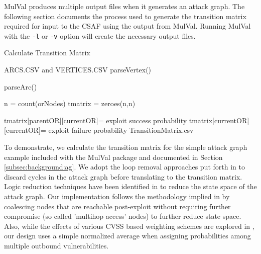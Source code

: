 
MulVal produces multiple output files when it generates an attack graph. The following section documents the process used to generate the transition matrix required for input to the CSAF using the output from MulVal. Running MulVal with the \verb|-l| or \verb|-v| option will create the necessary output files.


\begin{algorithm}
\caption{Calculate Transition Matrix}
\label{genTransMatrix}

\begin{algorithmic}
\REQUIRE ARCS.CSV and VERTICES.CSV
 \STATE parseVertex() 
\ENDFOR

 \STATE parseArc() 
\ENDFOR

\STATE n = count(orNodes) 
\STATE tmatrix = zeroes(n,n) 

 \STATE tmatrix[parentOR][currentOR]= exploit success probability
 \ENDFOR
 \STATE tmatrix[currentOR][currentOR]= exploit failure probability %
\ENDFOR
 \RETURN TransitionMatrix.csv
 \end{algorithmic}
\end{algorithm}


To demonstrate, we calculate the transition matrix for the simple attack graph example included with the MulVal package and documented in Section \ref{subsec:background:ag}. We adopt the loop removal approaches put forth in \cite{Ou_Boyer_McQueen_2006} to discard cycles in the attack graph before translating to the transition matrix. Logic reduction techniques have been identified in \cite{Hong_Kim_Takaoka_2013} to reduce the state space of the attack graph.  Our implementation follows the methodology implied in \cite{Abraham_2016} by coalescing nodes that are reachable post-exploit without requiring further compromise (so called 'multihop access' nodes) to further reduce state space. Also, while the effects of various CVSS based weighting schemes are explored in \cite{Sembiring_Ramadhan_Gondokaryono_Arman_2015}, our design uses a simple normalized average when assigning probabilities among multiple outbound vulnerabilities.

